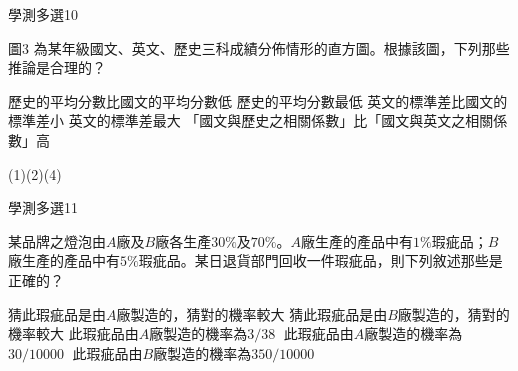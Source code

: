 \begin{QUESTIONS}
\begin{QUESTION}
\begin{QEMPTYSPACE}
        \end{QEMPTYSPACE}
    \end{QUESTION}
    \begin{QUESTION}
        \begin{ExamInfo}{85}{學測}{多選}{10}
        \end{ExamInfo}
        \begin{ExamAnsRateInfo}{}{}{}{}
        \end{ExamAnsRateInfo}
        \begin{QBODY}
            圖3 為某年級國文、英文、歷史三科成績分佈情形的直方圖。根據該圖，下列那些推論是合理的？
            \begin{QOPS} 
                \QOP 歷史的平均分數比國文的平均分數低
                \QOP 歷史的平均分數最低
                \QOP 英文的標準差比國文的標準差小
                \QOP 英文的標準差最大
                \QOP「國文與歷史之相關係數」比「國文與英文之相關係數」高
            \end{QOPS}            
        \end{QBODY}
        \begin{QFROMS}
        \end{QFROMS}
        \begin{QTAGS}\end{QTAGS}
        \begin{QANS}
            (1)(2)(4)
        \end{QANS}
        \begin{QSOLLIST}
        \end{QSOLLIST}
        \begin{QEMPTYSPACE}
        \end{QEMPTYSPACE}
    \end{QUESTION}
    \begin{QUESTION}
        \begin{ExamInfo}{85}{學測}{多選}{11}
        \end{ExamInfo}
        \begin{ExamAnsRateInfo}{}{}{}{}
        \end{ExamAnsRateInfo}
        \begin{QBODY}
            某品牌之燈泡由$A$廠及$B$廠各生產$30\%$及$70\%$。$A$廠生產的產品中有$1\%$瑕疵品；$B$廠生產的產品中有$5\%$瑕疵品。某日退貨部門回收一件瑕疵品，則下列敘述那些是正確的？
            \begin{QOPS} 
            \QOP 猜此瑕疵品是由$A$廠製造的，猜對的機率較大
            \QOP 猜此瑕疵品是由$B$廠製造的，猜對的機率較大
            \QOP 此瑕疵品由$A$廠製造的機率為${3}/{38}\;$
            \QOP 此瑕疵品由$A$廠製造的機率為${30}/{10000}\;$
            \QOP 此瑕疵品由$B$廠製造的機率為${350}/{10000}\;$
            \end{QOPS}
            

\end{QBODY}
\end{QUESTION}
\end{QUESTIONS}

